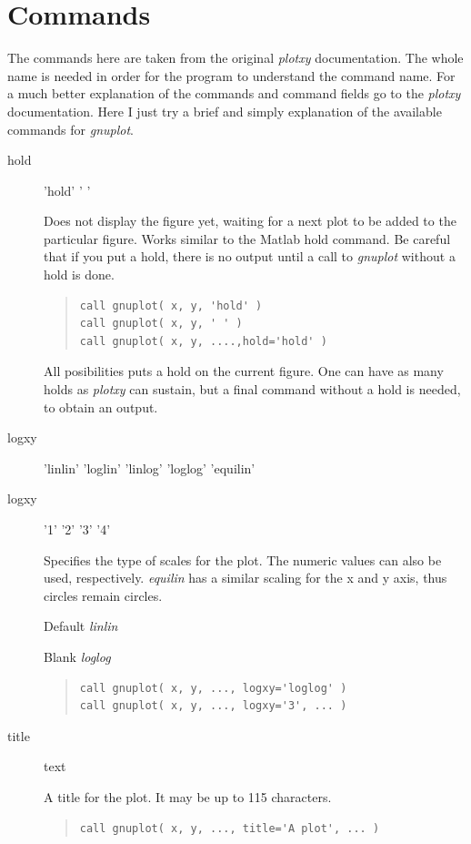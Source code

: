 \documentclass{article}
\begin{document}
\section{Commands}
The commands here are taken from the original {\it plotxy} documentation. The whole name is needed in order for the program to understand the command name. For a much better explanation of the commands and command fields go to the {\it plotxy} documentation. Here I just try a brief and simply explanation of the available commands for {\it gnuplot}. 
\begin{description}
\item[hold ] 'hold' ' '

Does not display the figure yet, waiting for a next plot to be added to the particular figure. Works similar to the Matlab hold command. Be careful that if you put a hold, there is no output until a call to {\it gnuplot} without a hold is done.
\begin{quote}
\begin{verbatim}
call gnuplot( x, y, 'hold' )
call gnuplot( x, y, ' ' )
call gnuplot( x, y, ....,hold='hold' )
\end{verbatim}
\end{quote}
All posibilities puts a hold on the current figure. One can have as many holds as {\it plotxy} can sustain, but a final command without a hold is needed, to obtain an output.

\item[logxy] 'linlin' 'loglin' 'linlog' 'loglog' 'equilin'
\item[logxy] '1' '2' '3' '4'

Specifies the type of scales for the plot. The numeric values can also be used, respectively. {\it equilin} has a similar scaling for the x and y axis, thus circles remain circles. 

Default {\it linlin}

Blank {\it loglog}
\begin{quote}
\begin{verbatim}
call gnuplot( x, y, ..., logxy='loglog' )
call gnuplot( x, y, ..., logxy='3', ... )
\end{verbatim}
\end{quote}

\item[title] text

A title for the plot. It may be up to 115 characters. 
\begin{quote}
\begin{verbatim}
call gnuplot( x, y, ..., title='A plot', ... )
\end{verbatim}
\end{quote}


\end{description}
\end{document}
